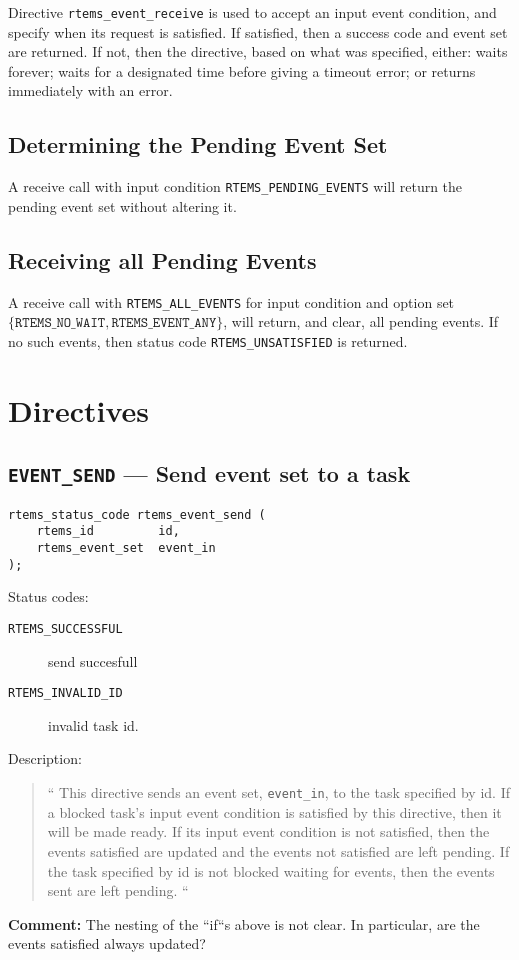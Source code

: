 Directive \texttt{rtems\_event\_receive}
is used to accept an input event condition,
and specify when its request is satisfied.
If satisfied, then a success code and event set are returned.
If not, then the directive, based on what was specified,
either:
waits forever;
waits for a designated time before giving a timeout error;
or returns immediately with an error.

\subsection{Determining the Pending Event Set}

A receive call with input condition \texttt{RTEMS\_PENDING\_EVENTS}
will return the pending event set without altering it.

\subsection{Receiving all Pending Events}

A receive call with \texttt{RTEMS\_ALL\_EVENTS} for input condition
and option set $\{\texttt{RTEMS\_NO\_WAIT},\texttt{RTEMS\_EVENT\_ANY}\}$,
will return, and clear, all pending events.
If no such events, then status code \texttt{RTEMS\_UNSATISFIED} is returned.

\newpage
\section{Directives}

\subsection{\texttt{EVENT\_SEND} --- Send event set to a task}

\begin{verbatim}
rtems_status_code rtems_event_send (
    rtems_id         id,
    rtems_event_set  event_in
);
\end{verbatim}

Status codes:
\begin{description}
  \item [\texttt{RTEMS\_SUCCESSFUL}] send succesfull
  \item [\texttt{RTEMS\_INVALID\_ID}]  invalid task id.
\end{description}

Description:
\begin{quote}
``
This directive sends an event set, \texttt{event\_in}, to the task specified by id.
If a blocked task’s input event condition is satisfied by this directive,
then it will be made ready.
If its input event condition is not satisfied,
then the events satisfied are updated
and the events not satisfied are left pending.
If the task specified by id is not blocked waiting for events,
then the events sent are left pending.
``
\end{quote}
\textbf{Comment:}
\textsf{
The nesting of the ``if``s above is not clear.
In particular, are the events satisfied always updated?
}

